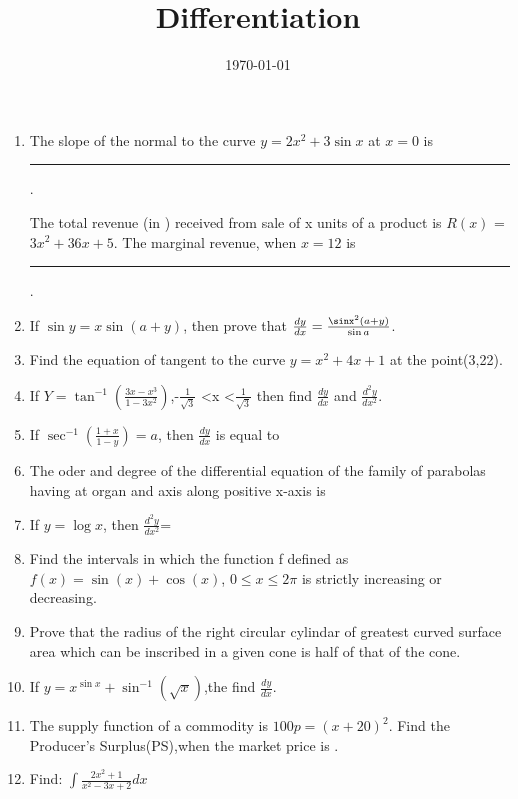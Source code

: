 \documentclass[12pt]{article}
\begin{document}
\title{\textbf{Differentiation}}
\date{\today}
\maketitle
\begin{enumerate}

\item
The slope of the normal to the curve $y=2x^2+3\sin{x}$ at $x=0$ is \rule{30pt}{1pt}.



The total revenue (in \rupee) received from sale of x units of a product is $R(x)$ = $3x^2+36x+5$. The marginal revenue, when $x=12$ is \rule{30pt}{1pt}.

\item
If $\sin y = x \sin(a+y)$, then prove that $\frac {dy}{dx} = \frac {\sinx^2(a+y)}{\sin a}$.

\item
Find the equation of tangent to the curve $y=x^2+4x+1$ at the point(3,22).

\item
If $Y = \tan^{-1}\left(\frac{3x - x^3}{1 - 3x^2}\right)$,-$\frac{1}{\sqrt{3}}$ \textless x \textless $\frac{1}{\sqrt{3}}$
then find $\frac{dy}{dx}$ and $\frac{{d^2y}}{{dx^2}}$.

\item
If $\sec^{-1}\left(\frac{1+x}{1-y}\right)=a$, then $\frac{dy}{dx}$ is equal to

\item
The oder and degree of the differential equation of the family of parabolas having at 
organ and axis along positive x-axis is

\item
If $y = \log x$, then $\frac{{d^2y}}{{dx^2}}$=

\item
	Find the intervals in which the function f defined as $f(x) = \sin(x) + \cos(x)$,
$0 \leq x \leq 2\pi$ is strictly increasing or decreasing.

\item
Prove that the radius of the right circular 
cylindar of greatest curved surface area which 
can be inscribed in a given cone is half of that of the cone.

\item
If $y=x^{\sin x }+\sin^{-1}(\sqrt x)$,the find $\frac{dy}{dx}$.

\item
	The supply function of a commodity is 
$100p = (x+20)^2$. Find the Producer's
Surplus(PS),when the market price is .


\item
Find:
$\int{\frac{2x^2 + 1}{x^2 - 3x + 2}}dx$





 

\end{enumerate}
\end{document}
